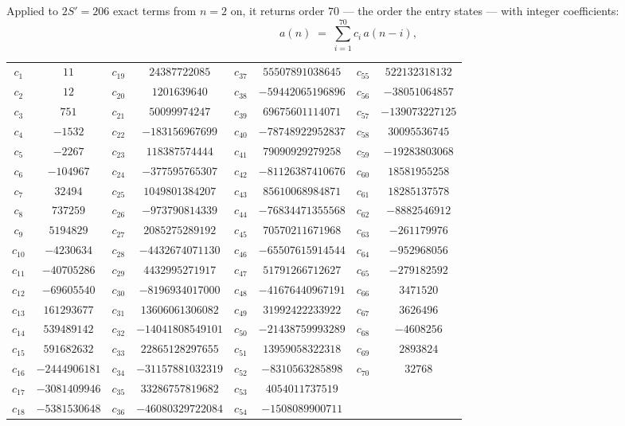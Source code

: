 \documentclass[11pt,a4paper]{article}
\theoremstyle{plain}
\theoremstyle{definition}
\begin{document}
Applied to $2S'=206$ exact terms from $n=2$ on, it returns order $70$ --- the
order the entry states --- with integer coefficients:
\[
a(n)\;=\;\sum_{i=1}^{70}c_i\,a(n-i),
\]
\begin{center}\small
\begin{tabular}{cccccccc}
$c_{1}$ & $11$ & $c_{19}$ & $24387722085$ & $c_{37}$ & $55507891038645$ & $c_{55}$ & $522132318132$ \\
$c_{2}$ & $12$ & $c_{20}$ & $1201639640$ & $c_{38}$ & $-59442065196896$ & $c_{56}$ & $-38051064857$ \\
$c_{3}$ & $751$ & $c_{21}$ & $50099974247$ & $c_{39}$ & $69675601114071$ & $c_{57}$ & $-139073227125$ \\
$c_{4}$ & $-1532$ & $c_{22}$ & $-183156967699$ & $c_{40}$ & $-78748922952837$ & $c_{58}$ & $30095536745$ \\
$c_{5}$ & $-2267$ & $c_{23}$ & $118387574444$ & $c_{41}$ & $79090929279258$ & $c_{59}$ & $-19283803068$ \\
$c_{6}$ & $-104967$ & $c_{24}$ & $-377595765307$ & $c_{42}$ & $-81126387410676$ & $c_{60}$ & $18581955258$ \\
$c_{7}$ & $32494$ & $c_{25}$ & $1049801384207$ & $c_{43}$ & $85610068984871$ & $c_{61}$ & $18285137578$ \\
$c_{8}$ & $737259$ & $c_{26}$ & $-973790814339$ & $c_{44}$ & $-76834471355568$ & $c_{62}$ & $-8882546912$ \\
$c_{9}$ & $5194829$ & $c_{27}$ & $2085275289192$ & $c_{45}$ & $70570211671968$ & $c_{63}$ & $-261179976$ \\
$c_{10}$ & $-4230634$ & $c_{28}$ & $-4432674071130$ & $c_{46}$ & $-65507615914544$ & $c_{64}$ & $-952968056$ \\
$c_{11}$ & $-40705286$ & $c_{29}$ & $4432995271917$ & $c_{47}$ & $51791266712627$ & $c_{65}$ & $-279182592$ \\
$c_{12}$ & $-69605540$ & $c_{30}$ & $-8196934017000$ & $c_{48}$ & $-41676440967191$ & $c_{66}$ & $3471520$ \\
$c_{13}$ & $161293677$ & $c_{31}$ & $13606061306082$ & $c_{49}$ & $31992422233922$ & $c_{67}$ & $3626496$ \\
$c_{14}$ & $539489142$ & $c_{32}$ & $-14041808549101$ & $c_{50}$ & $-21438759993289$ & $c_{68}$ & $-4608256$ \\
$c_{15}$ & $591682632$ & $c_{33}$ & $22865128297655$ & $c_{51}$ & $13959058322318$ & $c_{69}$ & $2893824$ \\
$c_{16}$ & $-2444906181$ & $c_{34}$ & $-31157881032319$ & $c_{52}$ & $-8310563285898$ & $c_{70}$ & $32768$ \\
$c_{17}$ & $-3081409946$ & $c_{35}$ & $33286757819682$ & $c_{53}$ & $4054011737519$ &  &  \\
$c_{18}$ & $-5381530648$ & $c_{36}$ & $-46080329722084$ & $c_{54}$ & $-1508089900711$ &  &  \\
\end{tabular}
\end{center}
\end{document}
